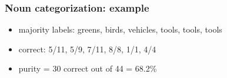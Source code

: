 \documentclass[t]{beamer} %
\begin{document}
\begin{frame}
\frametitle{Noun categorization: example}
\ungap[1]
\begin{center}
\end{center}
\ungap[1]
\begin{itemize}
\item<3-> majority labels: greens, birds, vehicles, tools, tools, tools
\item<3-> correct: 5/11, 5/9, 7/11, 8/8, 1/1, 4/4
\item<4-> purity = 30 correct out of 44 = 68.2\%
\end{itemize}
\end{frame}
\end{document}

